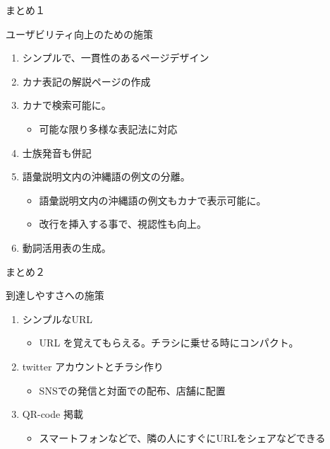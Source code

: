 \documentclass[14pt]{beamer}
\begin{document}
\begin{frame}{まとめ１}
  \begin{block}{ユーザビリティ向上のための施策}
    \begin{enumerate}
      \item シンプルで、一貫性のあるページデザイン
      \item カナ表記の解説ページの作成
      \item カナで検索可能に。
        \begin{itemize}
        \item 可能な限り多様な表記法に対応
        \end{itemize}
      \item 士族発音も併記
      \item 語彙説明文内の沖縄語の例文の分離。
      \begin{itemize}
      \item 語彙説明文内の沖縄語の例文もカナで表示可能に。
      \item 改行を挿入する事で、視認性も向上。
      \end{itemize}
    \item 動詞活用表の生成。
    \end{enumerate}
  \end{block}
\end{frame}

\begin{frame}{まとめ２}
  \begin{block}{到達しやすさへの施策}
    \begin{enumerate}
    \item シンプルなURL
      \begin{itemize}
      \item URL を覚えてもらえる。チラシに乗せる時にコンパクト。
      \end{itemize}
    \item twitter アカウントとチラシ作り
      \begin{itemize}
      \item SNSでの発信と対面での配布、店舗に配置
      \end{itemize}
    \item QR-code 掲載
      \begin{itemize}
      \item スマートフォンなどで、隣の人にすぐにURLをシェアなどできる
      \end{itemize}
    \end{enumerate}
  \end{block}
\end{frame}
\end{document}
